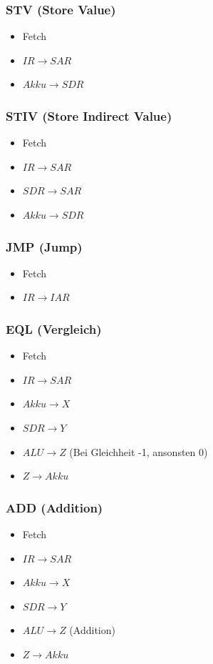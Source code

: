 \documentclass[a4paper,portrait]{scrartcl}
\begin{document}
\subsubsection{STV (Store Value)}
\begin{itemize}
\item Fetch
\item $IR \rightarrow SAR$
\item $Akku \rightarrow SDR$
\end{itemize}
\subsubsection{STIV (Store Indirect Value)}
\begin{itemize}
\item Fetch
\item $IR \rightarrow SAR$
\item $SDR \rightarrow SAR$
\item $Akku \rightarrow SDR$
\end{itemize}
\subsubsection{JMP (Jump)}
\begin{itemize}
\item Fetch
\item $IR \rightarrow IAR$
\end{itemize}
\subsubsection{EQL (Vergleich)}
\begin{itemize}
\item Fetch
\item $IR \rightarrow SAR$
\item $Akku \rightarrow X$
\item $SDR \rightarrow Y$
\item $ALU \rightarrow Z$ (Bei Gleichheit -1, ansonsten 0)
\item $Z \rightarrow Akku$
\end{itemize}
\subsubsection{ADD (Addition)}
\begin{itemize}
\item Fetch
\item $IR \rightarrow SAR$
\item $Akku \rightarrow X$
\item $SDR \rightarrow Y$
\item $ALU \rightarrow Z$ (Addition)
\item $Z \rightarrow Akku$
\end{itemize}
\end{document}
